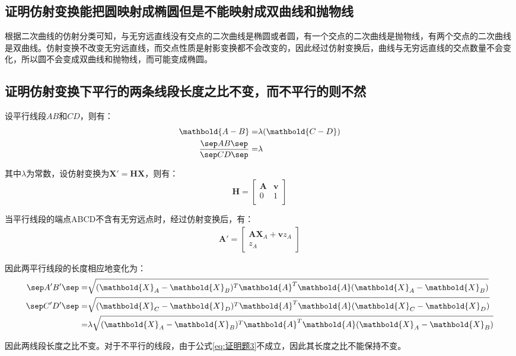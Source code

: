 \documentclass[11pt]{article}
\begin{document}
\subsection{证明仿射变换能把圆映射成椭圆但是不能映射成双曲线和抛物线}
根据二次曲线的仿射分类可知，与无穷远直线没有交点的二次曲线是椭圆或者圆，有一个交点的二次曲线是抛物线，有两个交点的二次曲线是双曲线。仿射变换不改变无穷远直线，而交点性质是射影变换都不会改变的，因此经过仿射变换后，曲线与无穷远直线的交点数量不会变化，所以圆不会变成双曲线和抛物线，而可能变成椭圆。
\subsection{证明仿射变换下平行的两条线段长度之比不变，而不平行的则不然}
设平行线段$AB$和$CD$，则有：
$$
  \begin{aligned}
    \mathbold{A-B}=                    & \lambda(\mathbold{C-D}) \\
    \frac{\sep AB\sep }{\sep CD\sep }= & \lambda
    \label{eq:证明题3}
  \end{aligned}
$$\par
其中$\lambda$为常数，设仿射变换为$\mathbold{X}'=\mathbold{HX}$，则有：
$$
  \mathbold{H}=\begin{bmatrix}
    \mathbold{A} & \mathbold{v} \\
    0            & 1            \\
  \end{bmatrix}
$$\par
当平行线段的端点ABCD不含有无穷远点时，经过仿射变换后，有：
$$
  \begin{aligned}
    \mathbold{A}'=\begin{bmatrix}
                    \mathbold{AX}_A+\mathbold{v}z_A \\
                    z_A
                  \end{bmatrix}
  \end{aligned}
$$\par
因此两平行线段的长度相应地变化为：
$$
  \begin{aligned}
    \sep A'B'\sep = & \sqrt{(\mathbold{X}_A-\mathbold{X}_B)^T\mathbold{A}^T\mathbold{A}(\mathbold{X}_A-\mathbold{X}_B)}        \\
    \sep C'D'\sep = & \sqrt{(\mathbold{X}_C-\mathbold{X}_D)^T\mathbold{A}^T\mathbold{A}(\mathbold{X}_C-\mathbold{X}_D)}        \\
    =               & \lambda\sqrt{(\mathbold{X}_A-\mathbold{X}_B)^T\mathbold{A}^T\mathbold{A}(\mathbold{X}_A-\mathbold{X}_B)} \\
  \end{aligned}
$$\par
因此两线段长度之比不变。对于不平行的线段，由于公式\ref{eq:证明题3}不成立，因此其长度之比不能保持不变。
\end{document}
